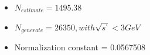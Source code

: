 \documentclass[aspectratio=169]{ctexbeamer}
\begin{document}
\begin{frame}
  \begin{columns}[t]
    \begin{column}{1.3\textheight}
      \begin{columns}
        \begin{column}{0.5\textwidth}
          \centering
        \end{column}
        \begin{column}{0.6\textwidth}
          \begin{itemize}
            \item $N_{estimate} =1495.38 $
            \item $N_{generate} =26350 , with \sqrt{s^{\prime}} < 3GeV$
            \item Normalization constant =  0.0567508
          \end{itemize}
        \end{column}
      \end{columns}
    \end{column}
  \end{columns}
\end{frame}
\end{document}
